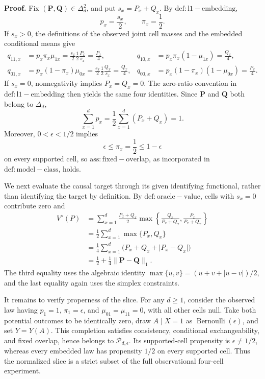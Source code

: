 \textbf{Proof.}
Fix \((\mathbf P,\mathbf Q)\in\Delta_d^2\), and put \(s_x=P_x+Q_x\).  By \(\mathrm{def:l1-embedding}\),
\[
 p_x=\frac{s_x}{2},\qquad \pi_x=\frac12.
\]
If \(s_x>0\), the definitions of the observed joint cell masses and the embedded conditional means give
\[
\begin{aligned}
 q_{11,x}
 &=p_x\pi_x\mu_{1x}
 =\frac{s_x}{2}\frac12\frac{P_x}{s_x}
 =\frac{P_x}{4},
&
 q_{10,x}
 &=p_x\pi_x(1-\mu_{1x})
 =\frac{Q_x}{4},\\
 q_{01,x}
 &=p_x(1-\pi_x)\mu_{0x}
 =\frac{s_x}{2}\frac12\frac{Q_x}{s_x}
 =\frac{Q_x}{4},
&
 q_{00,x}
 &=p_x(1-\pi_x)(1-\mu_{0x})
 =\frac{P_x}{4}.
\end{aligned}
\]
If \(s_x=0\), nonnegativity implies \(P_x=Q_x=0\).  The zero-ratio convention in \(\mathrm{def:l1-embedding}\) then yields the same four identities.  Since \(\mathbf P\) and \(\mathbf Q\) both belong to \(\Delta_d\),
\[
 \sum_{x=1}^d p_x
 =\frac12\sum_{x=1}^d(P_x+Q_x)
 =1.
\]
Moreover, \(0<\epsilon<1/2\) implies
\[
 \epsilon\le \pi_x=\frac12\le 1-\epsilon
\]
on every supported cell, so \(\mathrm{ass:fixed-overlap}\), as incorporated in \(\mathrm{def:model-class}\), holds.

We next evaluate the causal target through its given identifying functional, rather than identifying the target by definition.  By \(\mathrm{def:oracle-value}\), cells with \(s_x=0\) contribute zero and
\[
\begin{aligned}
 V^\star(P)
 &=\sum_{x=1}^d \frac{P_x+Q_x}{2}
   \max\!\left\{\frac{Q_x}{P_x+Q_x},
                    \frac{P_x}{P_x+Q_x}\right\}\\
 &=\frac12\sum_{x=1}^d\max\{P_x,Q_x\}\\
 &=\frac14\sum_{x=1}^d
   \bigl(P_x+Q_x+\lvert P_x-Q_x\rvert\bigr)\\
 &=\frac12+\frac14\lVert\mathbf P-\mathbf Q\rVert_1.
\end{aligned}
\]
The third equality uses the algebraic identity \(\max\{u,v\}=(u+v+\lvert u-v\rvert)/2\), and the last equality again uses the simplex constraints.

It remains to verify properness of the slice.  For any \(d\ge1\), consider the observed law having \(p_1=1\), \(\pi_1=\epsilon\), and \(\mu_{01}=\mu_{11}=0\), with all other cells null.  Take both potential outcomes to be identically zero, draw \(A\mid X=1\) as \(\operatorname{Bernoulli}(\epsilon)\), and set \(Y=Y(A)\).  This completion satisfies consistency, conditional exchangeability, and fixed overlap, hence belongs to \(\mathcal P_{d,\epsilon}\).  Its supported-cell propensity is \(\epsilon\ne1/2\), whereas every embedded law has propensity \(1/2\) on every supported cell.  Thus the normalized slice is a strict subset of the full observational four-cell experiment.


